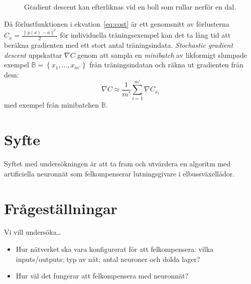 \begin{figure}
	\centering
	\caption{Gradient descent kan efterliknas vid en boll som rullar nerför en dal.}
	\label{fig:descent}
\end{figure}

Då förlustfunktionen i ekvation~\eqref{eq:cost} är ett genomsnitt av
förlusterna $ C_x = \frac{\lVert y(x) - a \rVert^2}{2} $ för individuella träningsexempel
kan det ta lång tid att beräkna gradienten med ett stort antal träningsindata.
\emph{Stochastic gradient descent} uppskattar $ \nabla C $ genom att
sampla en \emph{minibatch} av likformigt slumpade exempel
$ \mathbb{B} = \left\{ x_1, \dotsc, x_{m'} \right\} $ från träningsindatan
och räkna ut gradienten från dem:
\begin{equation}
	\nabla C \approx \frac{1}{m'} \sum^{m'}_{i=1} \nabla C_{x_i}
\end{equation}
med exempel från minibatchen $ \mathbb{B} $.
\autocite{goodfellow16,nielsen15}

\section{Syfte}
Syftet med undersökningen är att ta fram och utvärdera en algoritm med
artificiella neuronnät som felkompenserar lutningsgivare i elbussväxellådor.


\section{Frågeställningar}
Vi vill undersöka\ldots
\begin{itemize}
	\item Hur nätverket ska vara konfigurerat för att felkompensera: vilka
		inputs/outputs; typ av nät; antal neuroner och dolda lager?
	\item Hur väl det fungerar att felkompensera med neuronnät?
\end{itemize}

